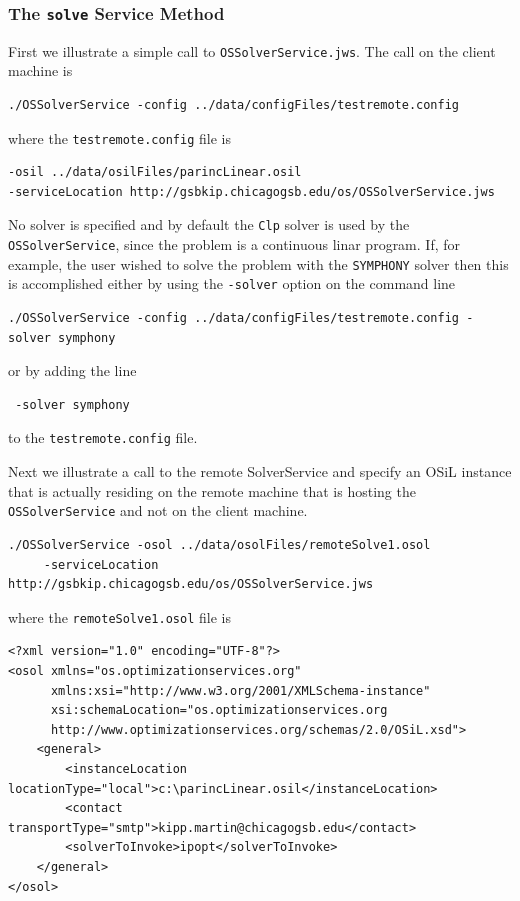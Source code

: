 \documentclass[11pt]{article}
\renewcommand{\_}{{\char"5F}}
\renewcommand{\{}{{\char"7B}}
\renewcommand{\}}{{\char"7D}}
\renewcommand{\^}{{\char"0D}}
\renewcommand{\'}{{\char"0D}}
\begin{document}
\begin{enumerate}[Step 1:]
\subsubsection{The  {\tt solve} Service Method}\label{section:solve}

First we illustrate a simple call to  {\tt OSSolverService.jws}.  The call on the client machine is
\begin{verbatim}
./OSSolverService -config ../data/configFiles/testremote.config
\end{verbatim}
where the {\tt testremote.config} file is
\begin{verbatim}
-osil ../data/osilFiles/parincLinear.osil
-serviceLocation http://gsbkip.chicagogsb.edu/os/OSSolverService.jws
\end{verbatim}

No solver is specified and by default the  {\tt Clp} solver  is used by the {\tt OSSolverService}, 
since the problem is a continuous linar program.
If, for example, the user wished to solve the problem with the {\tt SYMPHONY} solver then this is accomplished
either by using the  {\tt -solver} option on the command line
\begin{verbatim}
./OSSolverService -config ../data/configFiles/testremote.config -solver symphony
\end{verbatim}
or by  adding  the line
\begin{verbatim}
 -solver symphony
\end{verbatim}
to the  {\tt testremote.config} file.

Next we illustrate a call to the remote SolverService and specify an OSiL instance that is actually residing
on the remote machine that is hosting the {\tt OSSolverService} and not on the client machine.
\begin{verbatim}
./OSSolverService -osol ../data/osolFiles/remoteSolve1.osol
     -serviceLocation  http://gsbkip.chicagogsb.edu/os/OSSolverService.jws
\end{verbatim}
where the {\tt remoteSolve1.osol} file is
\begin{verbatim}
<?xml version="1.0" encoding="UTF-8"?>
<osol xmlns="os.optimizationservices.org"
      xmlns:xsi="http://www.w3.org/2001/XMLSchema-instance"
      xsi:schemaLocation="os.optimizationservices.org
      http://www.optimizationservices.org/schemas/2.0/OSiL.xsd">
    <general>
        <instanceLocation locationType="local">c:\parincLinear.osil</instanceLocation>
        <contact transportType="smtp">kipp.martin@chicagogsb.edu</contact>
        <solverToInvoke>ipopt</solverToInvoke>      
    </general>
</osol>
\end{verbatim}


\end{enumerate}
\end{document}
